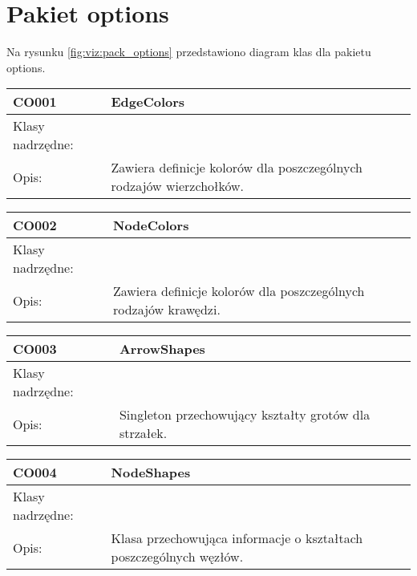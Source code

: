 \section{Pakiet options}


Na rysunku  \figurename \space \ref{fig:viz:pack_options}  przedstawiono diagram klas dla pakietu options.







\begin{center}

\begin{longtable}{|m{3.5cm}|m{8.5cm}|} \hline

CO001 & EdgeColors \\ \hline
Klasy nadrzędne: &     \\ \hline
Opis: & Zawiera definicje kolorów dla poszczególnych rodzajów wierzchołków.   \\ \hline

\end{longtable}

\begin{longtable}{|m{3.5cm}|m{8.5cm}|} \hline

CO002 & NodeColors \\ \hline
Klasy nadrzędne: &     \\ \hline
Opis: & Zawiera definicje kolorów dla poszczególnych rodzajów krawędzi.   \\ \hline



\end{longtable}

\begin{longtable}{|m{3.5cm}|m{8.5cm}|} \hline

CO003 & ArrowShapes \\ \hline
Klasy nadrzędne: &     \\ \hline
Opis: & Singleton przechowujący kształty grotów dla strzałek.   \\ \hline


\end{longtable}

\begin{longtable}{|m{3.5cm}|m{8.5cm}|} \hline

CO004 & NodeShapes \\ \hline
Klasy nadrzędne: &     \\ \hline
Opis: & Klasa przechowująca informacje o kształtach poszczególnych węzłów.   \\ \hline


\end{longtable}
\end{center}
